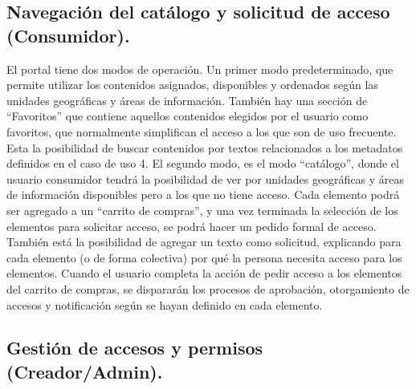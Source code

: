\subsection{Navegación del catálogo y solicitud de acceso (Consumidor).}
\label{usecases:browse}

El portal tiene dos modos de operación. Un primer modo predeterminado, que permite utilizar los contenidos asignados, disponibles y ordenados según las unidades geográficas y áreas de información.
	También hay una sección de “Favoritos” que contiene aquellos contenidos elegidos por el usuario como favoritos, que normalmente simplifican el acceso a los que son de uso frecuente.
	Esta la posibilidad de buscar contenidos por textos relacionados a los metadatos definidos en el caso de uso 4.
	El segundo modo, es el modo “catálogo”, donde el usuario consumidor tendrá la posibilidad de ver por unidades geográficas y áreas de información disponibles pero a los que no tiene acceso. Cada elemento podrá ser agregado a un “carrito de compras”, y una vez terminada la selección de los elementos para solicitar acceso, se podrá hacer un pedido formal de acceso. También está la posibilidad de agregar un texto como solicitud, explicando para cada elemento (o de forma colectiva) por qué la persona necesita acceso para los elementos. Cuando el usuario completa la acción de pedir acceso a los elementos del carrito de compras, se dispararán los procesos de aprobación, otorgamiento de accesos y notificación según se hayan definido en cada elemento.


\subsection{Gestión de accesos y permisos (Creador/Admin).}
\label{usecases:accessmgmnt}

